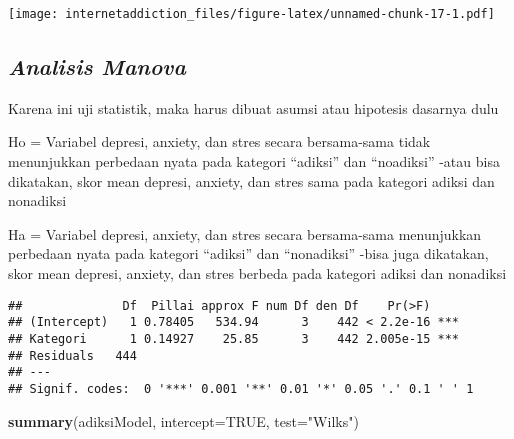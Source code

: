\documentclass[
]{article}
\newenvironment{Shaded}{\begin{snugshade}}{\end{snugshade}}
\newcommand{\DataTypeTok}[1]{\textcolor[rgb]{0.13,0.29,0.53}{#1}}
\newcommand{\KeywordTok}[1]{\textcolor[rgb]{0.13,0.29,0.53}{\textbf{#1}}}
\newcommand{\NormalTok}[1]{#1}
\newcommand{\OperatorTok}[1]{\textcolor[rgb]{0.81,0.36,0.00}{\textbf{#1}}}
\newcommand{\OtherTok}[1]{\textcolor[rgb]{0.56,0.35,0.01}{#1}}
\newcommand{\StringTok}[1]{\textcolor[rgb]{0.31,0.60,0.02}{#1}}
\begin{document}
\texttt{[image: internetaddiction\_files/figure-latex/unnamed-chunk-17-1.pdf]}

\hypertarget{analisis-manova}{%
\subsection{\texorpdfstring{\emph{Analisis
Manova}}{Analisis Manova}}\label{analisis-manova}}

Karena ini uji statistik, maka harus dibuat asumsi atau hipotesis
dasarnya dulu

Ho = Variabel depresi, anxiety, dan stres secara bersama-sama tidak
menunjukkan perbedaan nyata pada kategori ``adiksi'' dan ``noadiksi''
-atau bisa dikatakan, skor mean depresi, anxiety, dan stres sama pada
kategori adiksi dan nonadiksi

Ha = Variabel depresi, anxiety, dan stres secara bersama-sama
menunjukkan perbedaan nyata pada kategori ``adiksi'' dan ``nonadiksi''
-bisa juga dikatakan, skor mean depresi, anxiety, dan stres berbeda pada
kategori adiksi dan nonadiksi

\begin{Shaded}
\end{Shaded}

\begin{verbatim}
##              Df  Pillai approx F num Df den Df    Pr(>F)    
## (Intercept)   1 0.78405   534.94      3    442 < 2.2e-16 ***
## Kategori      1 0.14927    25.85      3    442 2.005e-15 ***
## Residuals   444                                             
## ---
## Signif. codes:  0 '***' 0.001 '**' 0.01 '*' 0.05 '.' 0.1 ' ' 1
\end{verbatim}

\begin{Shaded}
\begin{Highlighting}[]
\KeywordTok{summary}\NormalTok{(adiksiModel, }\DataTypeTok{intercept=}\OtherTok{TRUE}\NormalTok{, }\DataTypeTok{test=}\StringTok{"Wilks"}\NormalTok{) }
\end{Highlighting}
\end{Shaded}
\end{document}
